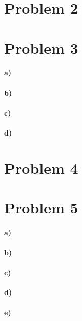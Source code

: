 \documentclass[12pt]{article}
\begin{document}
\section*{Problem 2}

\section*{Problem 3}

\paragraph{a)}

\paragraph{b)}

\paragraph{c)}

\paragraph{d)}

\section*{Problem 4}

\section*{Problem 5}

\paragraph{a)}

\paragraph{b)}

\paragraph{c)}

\paragraph{d)}

\paragraph{e)}
\end{document}
